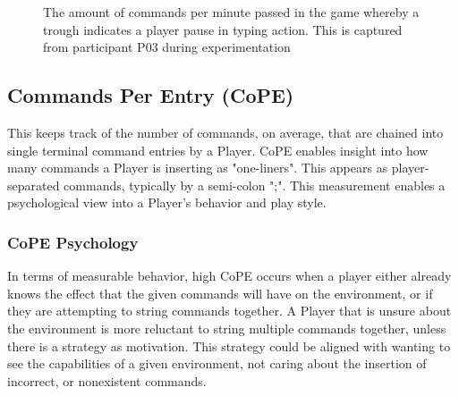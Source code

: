 \documentclass[10pt, titlepage, twocolumn]{article}
\newcommand{\ii}{\indent\indent}
\begin{document}
\begin{figure}[h!]
  \begin{center}
    \caption{The amount of commands per minute passed in the game whereby a trough indicates a player pause in typing action. This is captured from participant P03 during experimentation}
  \end{center}
\end{figure}





\subsection{Commands Per Entry (CoPE)}
\ii
This keeps track of the number of commands, on average, that are chained into single terminal command entries by a Player. CoPE enables insight into how many commands a Player is inserting as "one-liners". This appears as player-separated commands, typically by a semi-colon ";". This measurement enables a psychological view into a Player's behavior and play style.

\subsubsection{CoPE Psychology}
\ii
In terms of measurable behavior, high CoPE occurs when a player either already knows the effect that the given commands will have on the environment, or if they are attempting to string commands together. A Player that is unsure about the environment is more reluctant to string multiple commands together, unless there is a strategy as motivation. This strategy could be aligned with wanting to see the capabilities of a given environment, not caring about the insertion of incorrect, or nonexistent commands. 
\end{document}
